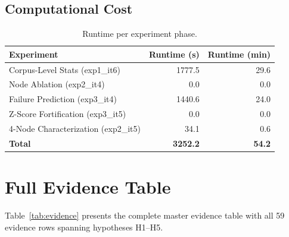 \documentclass[11pt,a4paper]{article}
\begin{document}
\subsection{Computational Cost}
\begin{table}[htbp]
\centering
\caption{Runtime per experiment phase.}
\label{tab:runtime}
\begin{tabular}{lrr}
\toprule
Experiment & Runtime (s) & Runtime (min) \\
\midrule
Corpus-Level Stats (exp1\_it6) & 1777.5 & 29.6 \\
Node Ablation (exp2\_it4) & 0.0 & 0.0 \\
Failure Prediction (exp3\_it4) & 1440.6 & 24.0 \\
Z-Score Fortification (exp3\_it5) & 0.0 & 0.0 \\
4-Node Characterization (exp2\_it5) & 34.1 & 0.6 \\
\midrule
\textbf{Total} & \textbf{3252.2} & \textbf{54.2} \\
\bottomrule
\end{tabular}
\end{table}


\section{Full Evidence Table}
Table~\ref{tab:evidence} presents the complete master evidence table with all 59 evidence rows spanning hypotheses H1--H5.
\end{document}
